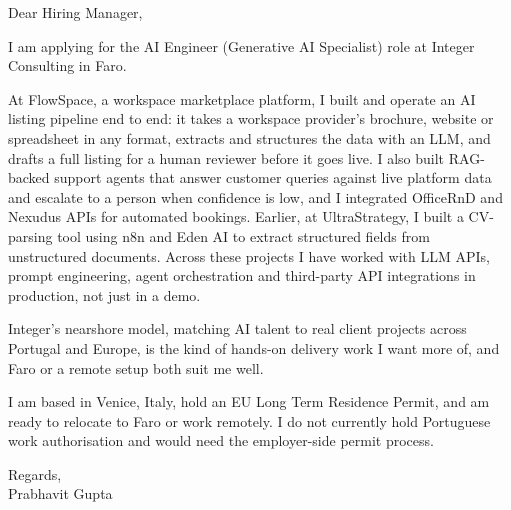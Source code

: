 \documentclass[a4paper,11pt]{article}
\begin{document}
Dear Hiring Manager,

I am applying for the AI Engineer (Generative AI Specialist) role at Integer Consulting in Faro.

At FlowSpace, a workspace marketplace platform, I built and operate an AI listing pipeline end to end: it takes a workspace provider's brochure, website or spreadsheet in any format, extracts and structures the data with an LLM, and drafts a full listing for a human reviewer before it goes live. I also built RAG-backed support agents that answer customer queries against live platform data and escalate to a person when confidence is low, and I integrated OfficeRnD and Nexudus APIs for automated bookings. Earlier, at UltraStrategy, I built a CV-parsing tool using n8n and Eden AI to extract structured fields from unstructured documents. Across these projects I have worked with LLM APIs, prompt engineering, agent orchestration and third-party API integrations in production, not just in a demo.

Integer's nearshore model, matching AI talent to real client projects across Portugal and Europe, is the kind of hands-on delivery work I want more of, and Faro or a remote setup both suit me well.

I am based in Venice, Italy, hold an EU Long Term Residence Permit, and am ready to relocate to Faro or work remotely. I do not currently hold Portuguese work authorisation and would need the employer-side permit process.

Regards,\\
Prabhavit Gupta
\end{document}
